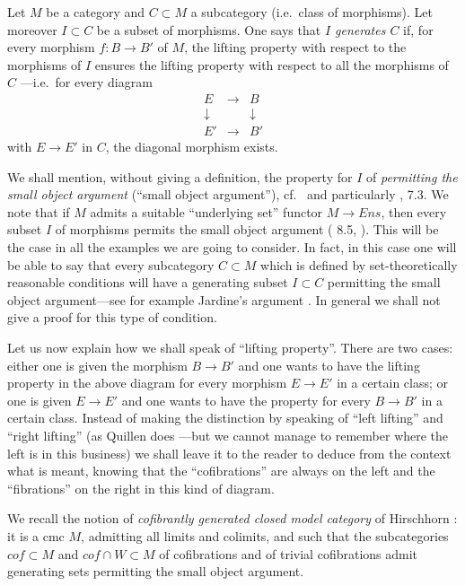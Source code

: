 Let $M$ be a category and $C\subset M$ a subcategory (i.e.\ class of
morphisms). Let moreover $I\subset C$ be a subset of morphisms. One says
that {\em $I$ generates $C$} if, for every morphism $f:B\rightarrow B'$ of
$M$, the lifting property \cite{Quillen} with respect to the morphisms of
$I$ ensures the lifting property with respect to all the morphisms of
$C$  ---i.e.\ for every diagram
$$
\begin{array}{ccc}
E&\rightarrow & B \\
\downarrow && \downarrow \\
E'&\rightarrow & B'
\end{array}
$$
with $E\rightarrow E'$ in $C$,
the diagonal morphism exists.

We shall mention, without giving a definition, the property for $I$ of {\em
permitting the small object argument} (``small object argument''), cf.\
\cite{Hirschhorn}  \cite{JardineGoerssBook} and particularly \cite{DHK},
7.3. We note that if $M$ admits a suitable ``underlying set'' functor
$M\rightarrow Ens$, then every subset $I$ of morphisms
permits the small object argument (\cite{DHK} 8.5, \cite{Hirschhorn}). This
will be the case in all the examples we are going to consider. In fact, in
this
case one
will be able to say that every subcategory $C\subset M$ which is defined by
set-theoretically reasonable conditions will have a generating subset
$I\subset C$ permitting the small object argument---see for example
Jardine's argument \cite{Jardine}. In general we shall not
give a proof for this type of condition.

Let us now explain how we shall speak of ``lifting
property''.
There are two cases: either one is given the morphism $B\rightarrow B'$ and
one wants to have the lifting property in the above diagram for every
morphism $E\rightarrow E'$ in a certain class; or one is given
$E\rightarrow E'$ and one wants to have the property for every $B\rightarrow B'$
in a certain class. Instead of making the distinction by speaking of
``left lifting'' and ``right lifting'' (as Quillen does
\cite{Quillen}---but we cannot manage to remember where the left is in
this business)
we shall leave it to the reader to deduce from the context what is meant,
knowing that the ``cofibrations'' are always on the left and the
``fibrations'' on the right in this kind of diagram.


We recall the notion of {\em cofibrantly generated closed model category}
of Hirschhorn \cite{Hirschhorn} \cite{DHK}: it is a cmc $M$,
admitting all limits and colimits, and such that the
subcategories $cof\subset
M$ and $cof \cap W \subset M$ of cofibrations and of trivial cofibrations
admit generating sets permitting the small object argument.


